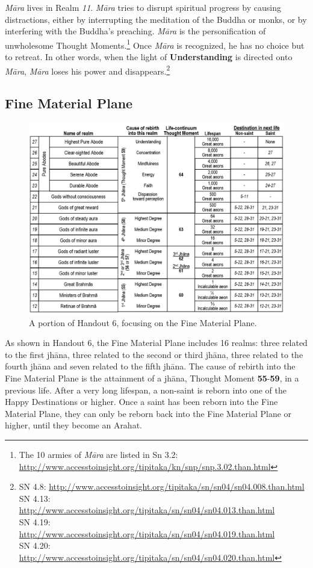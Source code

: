 \textit{Māra} lives in Realm \textit{11}. \textit{Māra} tries to disrupt spiritual progress by causing distractions, either by interrupting the meditation of the Buddha or monks, or by interfering with the Buddha’s preaching. \textit{Māra} is the personification of unwholesome Thought Moments.\footnote{The 10 armies of \textit{Māra} are listed in Sn 3.2: \url{http://www.accesstoinsight.org/tipitaka/kn/snp/snp.3.02.than.html}} Once \textit{Māra} is recognized, he has no choice but to retreat. In other words, when the light of \textbf{Understanding} is directed onto \textit{Māra}, \textit{Māra} loses his power and disappears.\footnote{SN 4.8: \url{http://www.accesstoinsight.org/tipitaka/sn/sn04/sn04.008.than.html}\\SN 4.13: \url{http://www.accesstoinsight.org/tipitaka/sn/sn04/sn04.013.than.html}\\SN 4.19: \url{http://www.accesstoinsight.org/tipitaka/sn/sn04/sn04.019.than.html}\\SN 4.20: \url{http://www.accesstoinsight.org/tipitaka/sn/sn04/sn04.020.than.html}}

\subsection*{Fine Material Plane}

\begin{figure}[h]
\centering
\includegraphics[width=0.9\linewidth]{./Diagrams/Fine1}
\caption{A portion of Handout 6, focusing on the Fine Material Plane.}
\label{fig:Fine1}
\end{figure}

As shown in Handout 6, the Fine Material Plane includes 16 realms: three related to the first jhāna, three related to the second or third jhāna, three related to the fourth jhāna and seven related to the fifth jhāna. The cause of rebirth into the Fine Material Plane is the attainment of a jhāna, Thought Moment \textbf{55}-\textbf{59}, in a previous life. After a very long lifespan, a non-saint is reborn into one of the Happy Destinations or higher. Once a saint has been reborn into the Fine Material Plane, they can only be reborn back into the Fine Material Plane or higher, until they become an Arahat.

